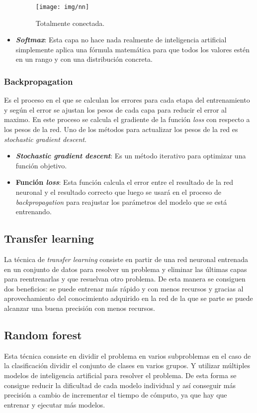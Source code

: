 \documentclass[12pt,a4paper]{article}
\begin{document}
\begin{itemize}
\begin{figure}[H]
\centering
\texttt{[image: img/nn]}
\caption{Totalmente conectada.}
\end{figure}

\item \textbf{\textit{Softmax}}: Esta capa no hace nada realmente de inteligencia artificial simplemente aplica una fórmula matemática para que todos los valores estén en un rango y con una distribución concreta.

\end{itemize}

\subsubsection{Backpropagation}
Es el proceso en el que se calculan los errores para cada etapa del entrenamiento y según el error se ajustan los pesos de cada capa para reducir el error al maximo. En este proceso se calcula el gradiente de la función \textit{loss} con respecto a los pesos de la red. Uno de los métodos para actualizar los pesos de la red es \textit{stochastic gradient descent}.

\begin{itemize}
\item \textbf{\textit{Stochastic gradient descent}}: Es un método iterativo para optimizar una función objetivo.

\item \textbf{Función \textit{loss}}: Esta función calcula el error entre el resultado de la red neuronal y el resultado correcto que luego se usará en el proceso de \textit{backpropagation} para reajustar los parámetros del modelo que se está entrenando.

\end{itemize}

\subsection{Transfer learning}
La técnica de \textit{transfer learning} consiste en partir de una red neuronal entrenada en un conjunto de datos para resolver un problema y eliminar las últimas capas para reentrenarlas y que resuelvan otro problema. De esta manera se consiguen dos beneficios: se puede entrenar más rápido y con menos recursos y gracias al aprovechamiento del conocimiento adquirido en la red de la que se parte se puede alcanzar una buena precisión con menos recursos.

\subsection{Random forest}
Esta técnica consiste en dividir el problema en varios subproblemas en el caso de la clasificación dividir el conjunto de clases en varios grupos. Y utilizar múltiples modelos de inteligencia artificial para resolver el problema. De esta forma se consigue reducir la dificultad de cada modelo individual y así conseguir más precisión a cambio de incrementar el tiempo de cómputo, ya que hay que entrenar y ejecutar más modelos.
\end{document}
